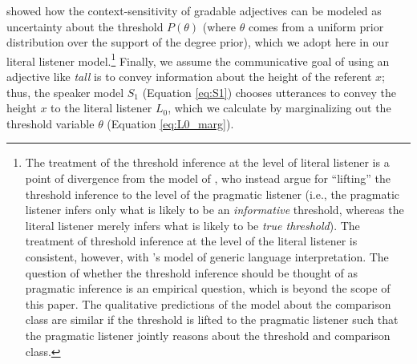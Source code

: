 \documentclass[doc, floatsintext]{apa6}
\newcommand{\red}[1]{\textcolor{Red}{#1}}
\begin{document}
 showed how the context-sensitivity of gradable adjectives can be modeled as uncertainty about the threshold $P(\theta)$ (where $\theta$ comes from a uniform prior distribution over the support of the degree prior), which we adopt here in our literal listener model.\footnote{
	The treatment of the threshold inference at the level of literal listener is a point of divergence from the model of , who instead argue for ``lifting'' the threshold inference to the level of the pragmatic listener (i.e., the pragmatic listener infers only what is likely to be an \emph{informative} threshold, whereas the literal listener merely infers what is likely to be \emph{true threshold}). The treatment of threshold inference at the level of the literal listener is consistent, however, with 's model of generic language interpretation.
	The question of whether the threshold inference should be thought of as pragmatic inference is an empirical question, which is beyond the scope of this paper.  The qualitative predictions of the model about the comparison class are similar if the threshold is lifted to the pragmatic listener such that the pragmatic listener jointly reasons about the threshold and comparison class.
}
Finally, we assume the communicative goal of using an adjective like \emph{tall} is to convey information about the height of the referent $x$; thus, the speaker model $S_1$ (Equation \ref{eq:S1}) chooses utterances to convey the height $x$ to the literal listener $L_0$, which we calculate by marginalizing out the threshold variable $\theta$ (Equation \ref{eq:L0_marg}).
\end{document}

